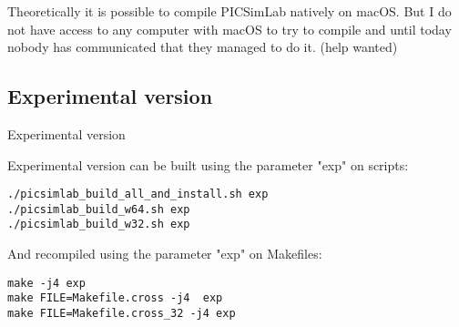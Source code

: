 Theoretically it is possible to compile PICSimLab natively on macOS. But I do not have access to any computer
 with macOS to try to compile and until today nobody has communicated that they managed to do it. (help wanted) 


\subsection{Experimental version}
Experimental version

Experimental version can be built using the parameter "exp" on scripts:
\begin{verbatim}
./picsimlab_build_all_and_install.sh exp
./picsimlab_build_w64.sh exp
./picsimlab_build_w32.sh exp
\end{verbatim}
And recompiled using the parameter "exp" on Makefiles:
\begin{verbatim}
make -j4 exp
make FILE=Makefile.cross -j4  exp
make FILE=Makefile.cross_32 -j4 exp
\end{verbatim}
 
